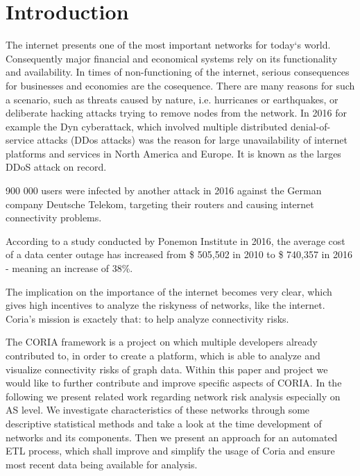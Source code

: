 \documentclass[conference]{IEEEtran}
\begin{document}
\section{Introduction}

The internet presents one of the most important networks for today‘s world. Consequently major financial and economical systems rely on its functionality and availability. In times of non-functioning of the internet, serious consequences for businesses and economies are the cosequence. There are many reasons for such a scenario, such as threats caused by nature, i.e. hurricanes or earthquakes, or deliberate hacking attacks trying to remove nodes from the network.  
In 2016 for example the Dyn cyberattack, which involved multiple distributed denial-of-service attacks (DDos attacks) was the reason for large unavailability of internet platforms and services in North America and Europe. It is known as the larges DDoS attack on record.

900 000 users were infected by another attack in 2016 against the German company Deutsche Telekom, targeting their routers and causing internet connectivity problems. 

According to a study conducted by Ponemon Institute in 2016, the average cost of a data center outage has increased from \$ 505,502 in 2010 to \$ 740,357 in 2016 - meaning an increase of 38\%. 


The implication on the importance of the internet becomes very clear, which gives high incentives to analyze the riskyness of networks, like the internet. Coria's mission is exactely that: to help analyze connectivity risks. 


The CORIA framework is a project on which multiple developers already contributed to, in order to create a platform, which is able to analyze and visualize connectivity risks of graph data. Within this paper and project we would like to further contribute and improve specific aspects of CORIA. In the following we present related work regarding network risk analysis especially on AS level. We investigate characteristics of these networks through some descriptive statistical methods and take a look at the time development of networks and its components. Then we present an approach for an automated ETL process, which shall improve and simplify the usage of Coria and ensure most recent data being available for analysis. \\
\end{document}
